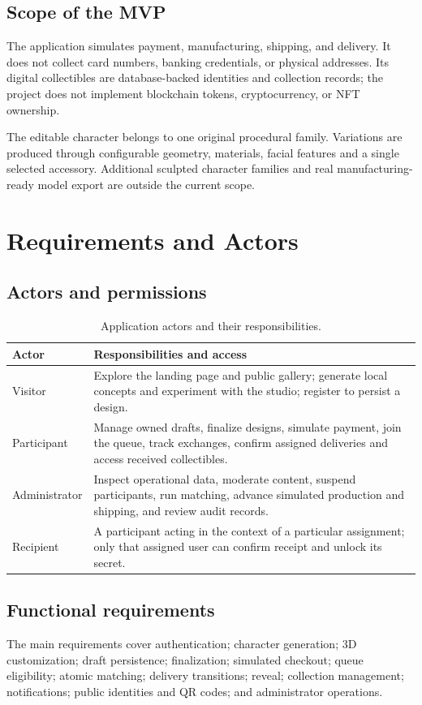 \documentclass[11pt,a4paper]{article}
\begin{document}
\subsection{Scope of the MVP}
The application simulates payment, manufacturing, shipping, and delivery. It does not collect card numbers, banking credentials, or physical addresses. Its digital collectibles are database-backed identities and collection records; the project does not implement blockchain tokens, cryptocurrency, or NFT ownership.

The editable character belongs to one original procedural family. Variations are produced through configurable geometry, materials, facial features and a single selected accessory. Additional sculpted character families and real manufacturing-ready model export are outside the current scope.

\section{Requirements and Actors}

\subsection{Actors and permissions}
\begin{table}[htbp]
\centering\small
\begin{tabularx}{\textwidth}{p{2.7cm}Y}
\toprule
\textbf{Actor} & \textbf{Responsibilities and access}\\
\midrule
Visitor & Explore the landing page and public gallery; generate local concepts and experiment with the studio; register to persist a design.\\
Participant & Manage owned drafts, finalize designs, simulate payment, join the queue, track exchanges, confirm assigned deliveries and access received collectibles.\\
Administrator & Inspect operational data, moderate content, suspend participants, run matching, advance simulated production and shipping, and review audit records.\\
Recipient & A participant acting in the context of a particular assignment; only that assigned user can confirm receipt and unlock its secret.\\
\bottomrule
\end{tabularx}
\caption{Application actors and their responsibilities.}
\end{table}

\subsection{Functional requirements}
The main requirements cover authentication; character generation; 3D customization; draft persistence; finalization; simulated checkout; queue eligibility; atomic matching; delivery transitions; reveal; collection management; notifications; public identities and QR codes; and administrator operations.
\end{document}
